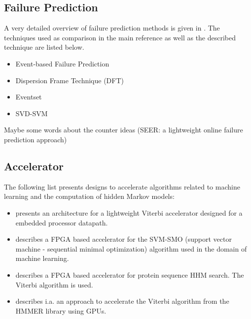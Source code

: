 \documentclass[12pt]{article} %
\begin{document}

\subsection{Failure Prediction} %

A very detailed overview of failure prediction methods is given in
\cite{ACM10_Salfner}. The techniques used as comparison in the main reference
\cite{salfner08} as well as the described technique are listed below.

\begin{itemize} %
    \item Event-based Failure Prediction \cite{salfner08} 
    \item Dispersion Frame Technique (DFT) \cite{lin88}
    \item Eventset \cite{ICDM02_Vilalta}
    \item SVD-SVM \cite{domeniconi02}
\end{itemize}

Maybe some words about the counter ideas (SEER: a lightweight online failure
prediction approach)


\subsection{Accelerator} %

The following list presents designs to accelerate algorithms related to machine
learning and the computation of hidden Markov models:
\begin{itemize}
    \item \cite{ASAP12_Azhar} presents an architecture for a lightweight Viterbi
        accelerator designed for a embedded processor datapath.
    \item \cite{FCCM09_Cadambi} describes a FPGA based accelerator for the
        SVM-SMO (support vector machine - sequential minimal optimization)
        algorithm used in the domain of machine learning.
    \item \cite{IPDPS07_Jacob,ICS06_Maddimsetty,IPDPS07_Oliver} describes a FPGA
        based accelerator for protein sequence HHM search. The Viterbi algorithm
        is used.
    \item \cite{IPDPS09_Walters} describes i.a. an approach to accelerate the
        Viterbi algorithm from the HMMER library using GPUs.
\end{itemize}
\end{document}
